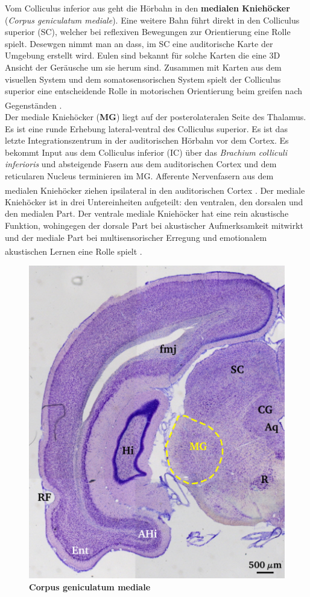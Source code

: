 \documentclass[12pt,a4paper,pdftex]{article}
\begin{document}
Vom Colliculus inferior aus geht die Hörbahn in den \textbf{medialen Kniehöcker} (\textit{Corpus geniculatum mediale}). Eine weitere Bahn führt direkt in den Colliculus superior (SC), welcher bei reflexiven Bewegungen zur Orientierung eine Rolle spielt. Desewgen nimmt man an dass, im SC eine auditorische Karte der Umgebung erstellt wird. Eulen sind bekannt für solche Karten die eine 3D Ansicht der Geräusche um sie herum sind. Zusammen mit Karten aus dem visuellen System und dem somatosensorischen System spielt der Colliculus superior eine entscheidende Rolle in motorischen Orientierung beim greifen nach Gegenständen \textsuperscript{\cite[31]{kandel2013principles}}.
\\
Der mediale Kniehöcker (\textbf{MG}) liegt auf der posterolateralen Seite des Thalamus. Es ist eine runde Erhebung lateral-ventral des Colliculus superior. Es ist das letzte Integrationszentrum in der auditorischen Hörbahn vor dem Cortex. Es bekommt Input aus dem Colliculus inferior (IC) über das \textit{Brachium colliculi inferioris} und absteigende Fasern aus dem auditorischen Cortex und dem reticularen Nucleus terminieren im MG. Afferente Nervenfasern aus dem medialen Kniehöcker ziehen ipsilateral in den auditorischen Cortex \textsuperscript{\cite[29]{paxinos2014rat}}. Der mediale Kniehöcker ist in drei Untereinheiten aufgeteilt: den ventralen, den dorsalen und den medialen Part. Der ventrale mediale Kniehöcker hat eine rein akustische Funktion, wohingegen der dorsale Part bei akustischer Aufmerksamkeit mitwirkt und der mediale Part bei multisensorischer Erregung und emotionalem akustischen Lernen eine Rolle spielt \textsuperscript{\cite[29]{paxinos2014rat}}.

\begin{figure}[H]
    \centering
    \includegraphics{pictures/auditory/MG.png}
    \caption[Corpus geniculatum mediale]{\textbf{Corpus geniculatum mediale}}
    \label{fig:MG}
\end{figure}
\end{document}
